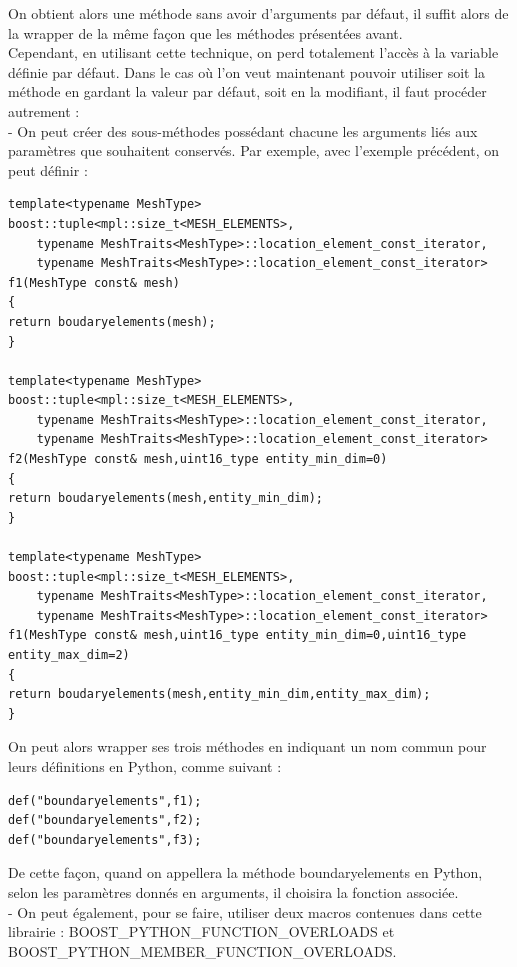 \documentclass[french,12pt]{article}
\begin{document}
On obtient alors une méthode sans avoir d'arguments par défaut, il suffit alors de la wrapper de la même façon que les méthodes présentées avant.\\

Cependant, en utilisant cette technique, on perd totalement l'accès à la variable définie par défaut. 
Dans le cas où l'on veut maintenant pouvoir utiliser soit la méthode en gardant la valeur par défaut, soit en la modifiant, il faut procéder autrement : \\

- On peut créer des sous-méthodes possédant chacune les arguments liés aux paramètres que souhaitent conservés. Par exemple, avec l'exemple précédent, on peut définir  : 
\begin{lstlisting}
template<typename MeshType>
boost::tuple<mpl::size_t<MESH_ELEMENTS>,
	typename MeshTraits<MeshType>::location_element_const_iterator,
	typename MeshTraits<MeshType>::location_element_const_iterator>
f1(MeshType const& mesh)
{
return boudaryelements(mesh);
}

template<typename MeshType>
boost::tuple<mpl::size_t<MESH_ELEMENTS>,
	typename MeshTraits<MeshType>::location_element_const_iterator,
	typename MeshTraits<MeshType>::location_element_const_iterator>
f2(MeshType const& mesh,uint16_type entity_min_dim=0)
{
return boudaryelements(mesh,entity_min_dim);
}

template<typename MeshType>
boost::tuple<mpl::size_t<MESH_ELEMENTS>,
	typename MeshTraits<MeshType>::location_element_const_iterator,
	typename MeshTraits<MeshType>::location_element_const_iterator>
f1(MeshType const& mesh,uint16_type entity_min_dim=0,uint16_type entity_max_dim=2)
{
return boudaryelements(mesh,entity_min_dim,entity_max_dim);
}
\end{lstlisting}

On peut alors wrapper ses trois méthodes en indiquant un nom commun pour leurs définitions en Python, comme suivant :
\begin{lstlisting}
def("boundaryelements",f1);
def("boundaryelements",f2);
def("boundaryelements",f3);
\end{lstlisting}

De cette façon, quand on appellera la méthode boundaryelements en Python, selon les paramètres donnés en arguments, il choisira la fonction associée.\\

- On peut également, pour se faire, utiliser deux macros contenues dans cette librairie : BOOST\_PYTHON\_FUNCTION\_OVERLOADS et \\ BOOST\_PYTHON\_MEMBER\_FUNCTION\_OVERLOADS.\\
\end{document}
